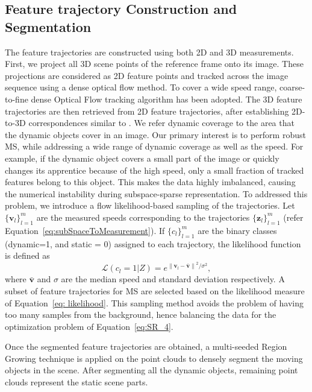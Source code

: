 \documentclass[10pt,twocolumn,letterpaper]{article}  %
\begin{document}
\subsection{Feature trajectory Construction and Segmentation}
The feature trajectories are constructed using both 2D and 3D measurements. First, we project  all 3D scene points of the reference frame onto its image.  These projections are considered as 2D feature points and tracked across the image sequence using  a dense optical flow method.  To cover a wide speed range, coarse-to-fine dense Optical Flow \cite{c24} tracking algorithm has been adopted. The 3D feature trajectories are then retrieved from 2D feature trajectories, after establishing 2D-to-3D correspondences similar to \cite{c31}. We refer dynamic coverage to the area that the dynamic objects cover in an image. Our primary interest is to perform robust MS, while addressing a wide range of dynamic coverage as well as the speed. For example, if the dynamic object covers a small part of the image or quickly changes its apprentice because of the high speed, only a small fraction of tracked features belong to this object. This makes the data highly imbalanced, causing the numerical instability during subspace-sparse representation. To addressed this problem, we introduce a flow likelihood-based sampling of the trajectories. Let $\{\mathbf{v}_l\}_{l=1}^m$ are the measured speeds corresponding to the  trajectories $\{\mathbf{z}_l\}_{l=1}^m$ (refer Equation~\eqref{eq:subSpaceToMeasurement}). If $\{c_l\}_{l=1}^m$ are the binary classes (dynamic=1, and static = 0) assigned to each trajectory, the likelihood function is defined as
\begin{equation}
\label{eq: likelihood}
\mathcal{L}(c_l=1|Z) = e^{{\parallel \mathbf{v}_l - \mathbf{ \bar{v}} \parallel}^2/ {\sigma^2} },
\end{equation}   
where $\mathbf{ \bar{v}}$ and $\sigma$ are the median speed and standard deviation respectively. A subset of feature trajectories for MS are selected based on the likelihood measure of Equation~\eqref{eq: likelihood}. This sampling method avoids the problem of having too many samples from the background, hence balancing the data for the optimization problem of Equation~\eqref{eq:SR_4}. 

Once the segmented feature trajectories are obtained, a multi-seeded Region Growing \cite{c25} technique is applied on the point clouds to densely segment the moving objects in the scene. After segmenting all the dynamic objects,  remaining point clouds represent the static scene parts.
\end{document}
